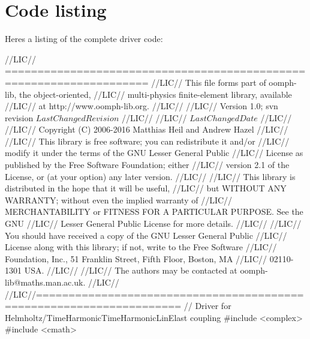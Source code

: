  

\hypertarget{index_code}{}\section{Code listing}\label{index_code}
Here\textquotesingle{}s a listing of the complete driver code\+:


\begin{DoxyCodeInclude}
\textcolor{comment}{//LIC// ====================================================================}
\textcolor{comment}{//LIC// This file forms part of oomph-lib, the object-oriented, }
\textcolor{comment}{//LIC// multi-physics finite-element library, available }
\textcolor{comment}{//LIC// at http://www.oomph-lib.org.}
\textcolor{comment}{//LIC// }
\textcolor{comment}{//LIC//    Version 1.0; svn revision $LastChangedRevision$}
\textcolor{comment}{//LIC//}
\textcolor{comment}{//LIC// $LastChangedDate$}
\textcolor{comment}{//LIC// }
\textcolor{comment}{//LIC// Copyright (C) 2006-2016 Matthias Heil and Andrew Hazel}
\textcolor{comment}{//LIC// }
\textcolor{comment}{//LIC// This library is free software; you can redistribute it and/or}
\textcolor{comment}{//LIC// modify it under the terms of the GNU Lesser General Public}
\textcolor{comment}{//LIC// License as published by the Free Software Foundation; either}
\textcolor{comment}{//LIC// version 2.1 of the License, or (at your option) any later version.}
\textcolor{comment}{//LIC// }
\textcolor{comment}{//LIC// This library is distributed in the hope that it will be useful,}
\textcolor{comment}{//LIC// but WITHOUT ANY WARRANTY; without even the implied warranty of}
\textcolor{comment}{//LIC// MERCHANTABILITY or FITNESS FOR A PARTICULAR PURPOSE.  See the GNU}
\textcolor{comment}{//LIC// Lesser General Public License for more details.}
\textcolor{comment}{//LIC// }
\textcolor{comment}{//LIC// You should have received a copy of the GNU Lesser General Public}
\textcolor{comment}{//LIC// License along with this library; if not, write to the Free Software}
\textcolor{comment}{//LIC// Foundation, Inc., 51 Franklin Street, Fifth Floor, Boston, MA}
\textcolor{comment}{//LIC// 02110-1301  USA.}
\textcolor{comment}{//LIC// }
\textcolor{comment}{//LIC// The authors may be contacted at oomph-lib@maths.man.ac.uk.}
\textcolor{comment}{//LIC// }
\textcolor{comment}{//LIC//====================================================================}
\textcolor{comment}{// Driver for Helmholtz/TimeHarmonicTimeHarmonicLinElast coupling}
\textcolor{preprocessor}{#include <complex>}
\textcolor{preprocessor}{#include <cmath>}


\end{DoxyCodeInclude}

